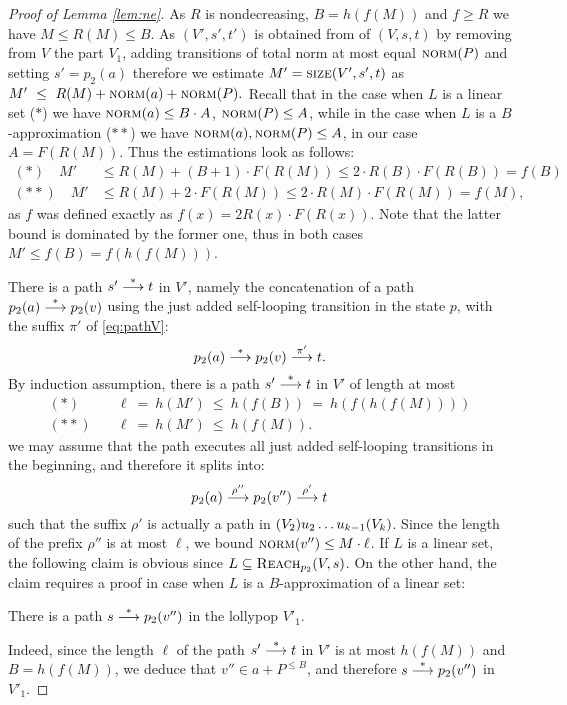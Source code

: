\begin{proof}[Proof of Lemma \ref{lem:ne}]
As $R$ is nondecreasing, $B = h(f(M))$ and $f \geq R$ we have $M \leq R(M) \leq B$.
As $(V',s',t')$ is obtained from of $(V,s,t)$ by removing from $V$ the part $V_1$,
adding transitions of total norm at most equal $\textsc{norm}(P)$ and setting $s' = p_2(a)$ 
therefore we estimate  $M' = \textsc{size}(V', s', t)$ as 
$
M' \ \leq \ R(M) + \textsc{norm}(a) + \textsc{norm}(P).
$
Recall that in the case when $L$ is a linear set ($*$) we have $\textsc{norm}(a) \leq B \cdot A$, $\textsc{norm}(P) \leq A$,
while in the case when $L$ is a $B$-approximation ($**$) we have $\textsc{norm}(a), \textsc{norm}(P) \leq A$,
in our case $A = F(R(M))$.
Thus the estimations
look as follows:
%
\begin{align*}
(*) \quad M' & \leq R(M) + (B+1) \cdot F(R(M)) \leq  2\cdot R(B) \cdot F(R(B)) = f(B)\\
(**) \quad M' & \leq R(M) + 2 \cdot F(R(M)) \leq 2\cdot R(M) \cdot F(R(M)) = f(M),
\end{align*}
as $f$ was defined exactly as $f(x) = 2R(x) \cdot F(R(x))$.
Note that the latter bound is dominated by the former one, thus in both cases $M' \leq f(B) = f(h(f(M)))$.

\smallskip

There is a path $s' \stackrel{*}{\longrightarrow} t$ in $V'$, namely the concatenation of  
a path $p_2(a) \stackrel{*}{\longrightarrow} p_2(v)$ using the 
just added self-looping transition in the state $p$, with the suffix $\pi'$ of \eqref{eq:pathV}:
\[
p_2(a) \stackrel{*}{\longrightarrow} p_2(v) \stackrel{\pi'}{\longrightarrow} t.
\]
By induction assumption, there is a path $s' \stackrel{*}{\longrightarrow} t$ in $V'$ of length at most
\begin{align*}
(*) \quad & \ell \ = \ h(M') \ \leq \ h(f(B)) \ = \ h(f(h(f(M))))\\
(**) \quad &  \ell \ = \ h(M') \ \leq \ h(f(M)).
%
\end{align*}
\Wlog we may assume that the path executes all just added self-looping transitions in the beginning,
and therefore it splits into:
\[
p_2(a) \stackrel{\rho''}{\longrightarrow} p_2(v'') \stackrel{\rho'}{\longrightarrow} t
\]
such that the suffix $\rho'$ is actually a path in $(V_2) u_2 \ldots u_{k-1} (V_k)$.
Since the length of the prefix $\rho''$ is at most $\ell$, 
we bound $\textsc{norm}(v'') \leq M \cdot \ell$.
%
If $L$ is a linear set, the following claim is obvious since $L\subseteq\textsc{Reach}_{p_2}(V,s)$.
On the other hand, the claim requires a proof in case when $L$ is a $B$-approximation of a linear set:
%
\begin{claim}[$**$]
There is a path $s \stackrel{*}{\longrightarrow} p_2(v'')$ in the lollypop \tvass $V'_1$.
\end{claim}
%
Indeed,  
since the length $\ell$ of the path $s'\stackrel{*}{\longrightarrow} t$ in $V'$ is at most $h(f(M))$
and $B= h(f(M))$, we deduce that $v'' \in a + P^{\leq B}$, and therefore $s\stackrel{*}{\longrightarrow} p_2(v'')$ in $ V'_1$.


\end{proof}
